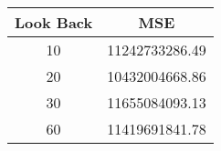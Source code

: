 \begin{tabular}{cc}
    \toprule
    Look Back & MSE \\
    \midrule
    10 & 11242733286.49 \\
    20 & 10432004668.86 \\
    30 & 11655084093.13 \\
    60 & 11419691841.78 \\
    \bottomrule
\end{tabular}
